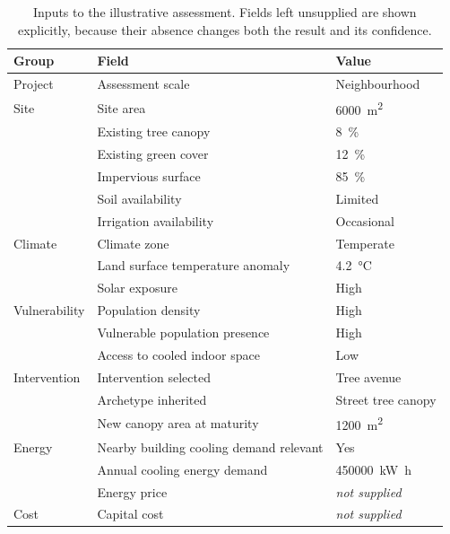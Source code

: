 \begin{table}[htbp]
\centering
\caption[Worked example inputs]{Inputs to the illustrative assessment. Fields
left unsupplied are shown explicitly, because their absence changes both the
result and its confidence.}
\label{tab:we-inputs}
\small
\begin{tabularx}{\textwidth}{@{}l>{\raggedright\arraybackslash}Xl@{}}
\toprule
\textbf{Group} & \textbf{Field} & \textbf{Value} \\
\midrule
Project    & Assessment scale                     & Neighbourhood \\
\addlinespace
Site       & Site area                            & \qty{6000}{\metre\squared} \\
           & Existing tree canopy                 & \SI{8}{\percent} \\
           & Existing green cover                 & \SI{12}{\percent} \\
           & Impervious surface                   & \SI{85}{\percent} \\
           & Soil availability                    & Limited \\
           & Irrigation availability              & Occasional \\
\addlinespace
Climate    & Climate zone                         & Temperate \\
           & Land surface temperature anomaly     & \qty{+4.2}{\degreeCelsius} \\
           & Solar exposure                       & High \\
\addlinespace
Vulnerability & Population density                & High \\
           & Vulnerable population presence       & High \\
           & Access to cooled indoor space        & Low \\
\addlinespace
Intervention & Intervention selected                & Tree avenue \\
           & Archetype inherited                  & Street tree canopy \\
           & New canopy area at maturity          & \qty{1200}{\metre\squared} \\
\addlinespace
Energy     & Nearby building cooling demand relevant & Yes \\
           & Annual cooling energy demand         & \qty{450000}{\kilo\watt\hour} \\
           & Energy price                         & \emph{not supplied} \\
\addlinespace
Cost       & Capital cost                         & \emph{not supplied} \\
\bottomrule
\end{tabularx}
\end{table}

